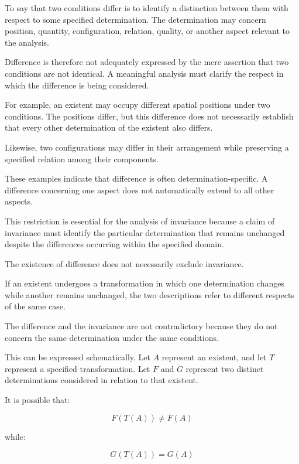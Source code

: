 To say that two conditions differ is to identify
a distinction between them with respect to some
specified determination. The determination may
concern position, quantity, configuration, relation,
quality, or another aspect relevant to the analysis.

Difference is therefore not adequately expressed
by the mere assertion that two conditions are not
identical. A meaningful analysis must clarify
the respect in which the difference is being
considered.

For example, an existent may occupy different
spatial positions under two conditions. The
positions differ, but this difference does not
necessarily establish that every other determination
of the existent also differs.

Likewise, two configurations may differ in their
arrangement while preserving a specified relation
among their components.

These examples indicate that difference is often
determination-specific. A difference concerning
one aspect does not automatically extend to all
other aspects.

This restriction is essential for the analysis
of invariance because a claim of invariance must
identify the particular determination that remains
unchanged despite the differences occurring
within the specified domain.


The existence of difference does not necessarily
exclude invariance.

If an existent undergoes a transformation in which
one determination changes while another remains
unchanged, the two descriptions refer to different
respects of the same case.

The difference and the invariance are not contradictory
because they do not concern the same determination
under the same conditions.

This can be expressed schematically. Let \(A\)
represent an existent, and let \(T\) represent
a specified transformation. Let \(F\) and \(G\)
represent two distinct determinations considered
in relation to that existent.

It is possible that:

\[
F(T(A)) \neq F(A)
\]

while:

\[
G(T(A)) = G(A)
\]


